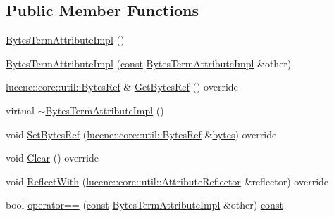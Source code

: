 \subsection*{Public Member Functions}
\begin{DoxyCompactItemize}
\item 
\mbox{\hyperlink{classlucene_1_1core_1_1analysis_1_1tokenattributes_1_1BytesTermAttributeImpl_a615b3f72279153190787e471fcf1e550}{Bytes\+Term\+Attribute\+Impl}} ()
\item 
\mbox{\hyperlink{classlucene_1_1core_1_1analysis_1_1tokenattributes_1_1BytesTermAttributeImpl_a7fa1f130126d96924101d3ab9716f921}{Bytes\+Term\+Attribute\+Impl}} (\mbox{\hyperlink{ZlibCrc32_8h_a2c212835823e3c54a8ab6d95c652660e}{const}} \mbox{\hyperlink{classlucene_1_1core_1_1analysis_1_1tokenattributes_1_1BytesTermAttributeImpl}{Bytes\+Term\+Attribute\+Impl}} \&other)
\item 
\mbox{\hyperlink{classlucene_1_1core_1_1util_1_1BytesRef}{lucene\+::core\+::util\+::\+Bytes\+Ref}} \& \mbox{\hyperlink{classlucene_1_1core_1_1analysis_1_1tokenattributes_1_1BytesTermAttributeImpl_ab0c78ee232b1546b553118afc0117374}{Get\+Bytes\+Ref}} () override
\item 
virtual \mbox{\hyperlink{classlucene_1_1core_1_1analysis_1_1tokenattributes_1_1BytesTermAttributeImpl_a03844cda01d3357b0e60ae4424fafc33}{$\sim$\+Bytes\+Term\+Attribute\+Impl}} ()
\item 
void \mbox{\hyperlink{classlucene_1_1core_1_1analysis_1_1tokenattributes_1_1BytesTermAttributeImpl_a132152487a88eae5feb1f88543d08c65}{Set\+Bytes\+Ref}} (\mbox{\hyperlink{classlucene_1_1core_1_1util_1_1BytesRef}{lucene\+::core\+::util\+::\+Bytes\+Ref}} \&\mbox{\hyperlink{classlucene_1_1core_1_1analysis_1_1tokenattributes_1_1BytesTermAttributeImpl_aedd53d552069d367ff2ede8111ce1944}{bytes}}) override
\item 
void \mbox{\hyperlink{classlucene_1_1core_1_1analysis_1_1tokenattributes_1_1BytesTermAttributeImpl_a6fa48596a507c937bd874d46ef5ca963}{Clear}} () override
\item 
void \mbox{\hyperlink{classlucene_1_1core_1_1analysis_1_1tokenattributes_1_1BytesTermAttributeImpl_a6a1789244604f807529de975d4c10171}{Reflect\+With}} (\mbox{\hyperlink{namespacelucene_1_1core_1_1util_a7dbb701adaed055f73fb95eec83da10a}{lucene\+::core\+::util\+::\+Attribute\+Reflector}} \&reflector) override
\item 
bool \mbox{\hyperlink{classlucene_1_1core_1_1analysis_1_1tokenattributes_1_1BytesTermAttributeImpl_a7cb94efc8c682f0caf2bca4f0ffb2981}{operator==}} (\mbox{\hyperlink{ZlibCrc32_8h_a2c212835823e3c54a8ab6d95c652660e}{const}} \mbox{\hyperlink{classlucene_1_1core_1_1analysis_1_1tokenattributes_1_1BytesTermAttributeImpl}{Bytes\+Term\+Attribute\+Impl}} \&other) \mbox{\hyperlink{ZlibCrc32_8h_a2c212835823e3c54a8ab6d95c652660e}{const}}

\end{DoxyCompactItemize}
